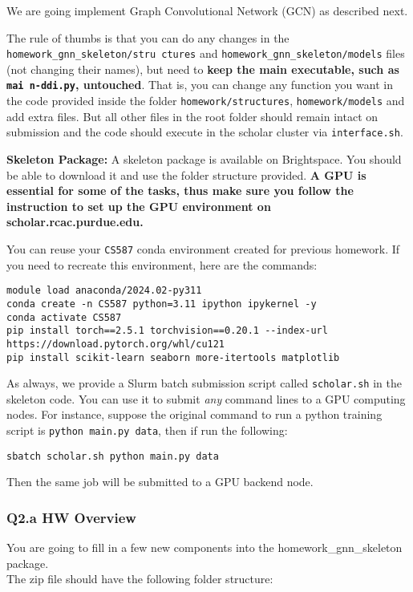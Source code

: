
%
%
\noindent
%
We are going implement Graph Convolutional Network (GCN) as described next.

The rule of thumbs is that you can do any changes in the \texttt{homework\homeworknumber\_gnn\_skeleton/stru%
ctures} and \texttt{homework\homeworknumber\_gnn\_skeleton/models} files (not changing their names), but need
to \textbf{keep the main executable, such as \texttt{mai%
n-ddi.py}, untouched}.
%
That is, you can change any function you want in the code provided inside the
folder \texttt{homework/structures}, \texttt{homework/models} and add extra
files.
%
But all other files in the root folder should remain intact on submission and
the code should execute in the scholar cluster via \texttt{interface.sh}.

%
\hfill

%
\noindent \textbf{Skeleton Package:}
%
A skeleton package is available on Brightspace.
%
You should be able to download it and use the folder structure provided.
%
\textbf{A GPU is essential for some of the tasks, thus make sure you follow the
instruction to set up the GPU environment on scholar.rcac.purdue.edu.}
%

% 
You can reuse your \texttt{CS587} conda environment created for previous homework. If you need to recreate this environment, here are the commands:


\begin{verbatim}
module load anaconda/2024.02-py311
conda create -n CS587 python=3.11 ipython ipykernel -y
conda activate CS587
pip install torch==2.5.1 torchvision==0.20.1 --index-url https://download.pytorch.org/whl/cu121
pip install scikit-learn seaborn more-itertools matplotlib 
\end{verbatim}

As always, we provide a Slurm batch submission script called \texttt{scholar.sh} in the skeleton code. You can use it to submit \emph{any} command lines to a GPU computing nodes. For instance, suppose the original command to run a python training script is \texttt{python main.py data}, then if run the following:
\begin{verbatim}
sbatch scholar.sh python main.py data
\end{verbatim}
Then the same job will be submitted to a GPU backend node. 


%
\subsubsection*{Q2.a HW Overview}
You are going to fill in a few new components into the homework\homeworknumber\_gnn\_skeleton package.
\\
%
\noindent The zip file should have the following folder structure:

